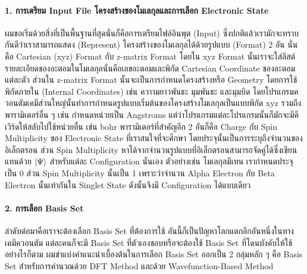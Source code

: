 \paragraph{1. การเตรียม Input File โครงสร้างของโมเลกุลและการเลือก Electronic State}
ผมขอเริ่มด้วยสิ่งที่เป็นพื้นฐานที่สุดนั่นก็คือการเตรียมไฟล์อินพุต (Input) ซึ่งปกติแล้วเรามักจะทราบกันดีว่าเราสามารถแสดง (Represent)
โครงสร้างของโมเลกุลได้ด้วยรูปแบบ (Format) 2 อัน นั่นคือ Cartesian (xyz) Format กับ z-matrix Format โดยใน xyz Format
นั้นเราจะใส่ลิสต์รายละเอียดของอะตอมในโมเลกุลนั่นคือเลขอะตอมและพิกัด Cartesian Coordinate ของอะตอมแต่ละตัว ส่วนใน z-matrix
Format นั้นจะเป็นการกำหนดโครงสร้างหรือ Geometry โดยการใช้พิกัดภายใน (Internal Coordinates) เช่น ควาามยาวพันธะ มุมพันธะ
และมุมบิด โดยโปรแกรมควอนตัมเคมีส่วนใหญ่นั้นทำการกำหนดรูปแบบเริ่มต้นของโครงสร้างโมเลกุลเป็นแบบพิกัด xyz รวมถึงพารามิเตอร์อื่น ๆ
เช่น กำหนดหน่วยเป็น Angstroms แต่ว่าโปรแกรมแต่ละโปรแกรมนั้นก็มักจะมีคีเวิร์ดให้สลับไปใช้หน่วยอื่น เช่น bohr พารามิเตอร์ที่สำคัญอีก 2
อันก็คือ Charge กับ Spin Multiplicity ของ Electronic State ที่เราสนใจที่จะศึกษา โดยประจุนั้นเป็นการระบุถึงจำนวนของอิเล็กตรอน
ส่วน Spin Multiplicity หาได้จากจำนวนรูปแบบที่อิเล็กตรอนสามารถจัดคู่ได้ซึ่งเขียนแทนด้วย $\ket{\Psi}$ สำหรับแต่ละ Configuration
นั่นเอง ตัวอย่างเช่น โมเลกุลมีเทน  เรากำหนดประจุเป็น 0 ส่วน Spin Multiplicity นั้นเป็น 1 เพราะว่าจำนวน Alpha Electron
กับ Beta Electron นั้นเท่ากันใน Singlet State ดังนั้นจึงมี Configuration ได้แบบเดียว

\paragraph{2. การเลือก Basis Set}
ลำดับต่อมาคือเราจะต้องเลือก Basis Set ที่ต้องการใช้ อันนี้ก็เป็นปัญหาโลกแตกอีกอันหนึ่งในทางเคมีควอนตัม แต่ละคนก็จะมี Basis Set
ที่ตัวเองชอบหรือจะต้องใช้ Basis Set ที่โดนบังคับให้ใช้ อย่างไรก็ตาม ผมขำแบ่งคำแนะนำเบื้องต้นในการเลือก Basis Set ออกเป็น 2 กลุ่มหลัก ๆ
คือ Basis Set สำหรับการคำนวณด้วย DFT Method และด้วย Wavefunction-Based Method

